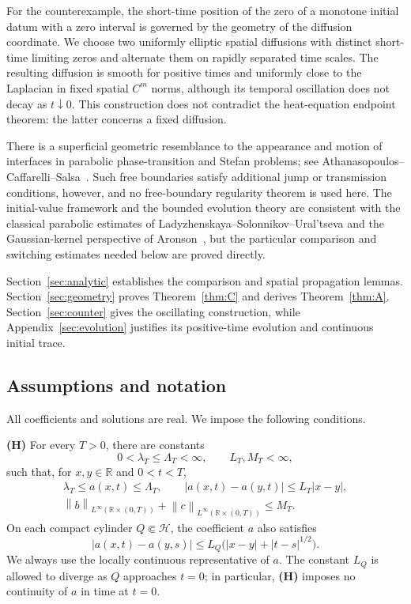 \documentclass[11pt,reqno]{amsart}
\numberwithin{equation}{section}
\theoremstyle{definition}
\theoremstyle{remark}
\newcommand{\R}{\mathbb R}
\newcommand{\HH}{\mathcal H}
\newcommand{\norm}[1]{\left\lVert#1\right\rVert}
\begin{document}
For the counterexample, the short-time position of the zero of a monotone
initial datum with a zero interval is governed by the geometry of the
diffusion coordinate.  We choose two uniformly elliptic spatial
diffusions with distinct short-time limiting zeros and alternate them
on rapidly separated time scales.  The resulting diffusion is smooth
for positive times and uniformly close to the Laplacian in fixed
spatial $C^m$ norms, although its temporal oscillation does not decay
as $t\downarrow0$.  This construction does not contradict the heat-equation endpoint theorem: the latter concerns a fixed diffusion.

There is a superficial geometric resemblance to the appearance and
motion of interfaces in parabolic phase-transition and Stefan problems;
see Athanasopoulos--Caffarelli--Salsa~\cite{ACS}.  Such free boundaries
satisfy additional jump or transmission conditions, however, and no
free-boundary regularity theorem is used here.  The initial-value
framework and the bounded evolution theory are consistent with the
classical parabolic estimates of Ladyzhenskaya--Solonnikov--Ural'tseva
\cite{LSU} and the Gaussian-kernel perspective of Aronson~\cite{Aronson},
but the particular comparison and switching estimates needed below are
proved directly.

Section~\ref{sec:analytic} establishes the comparison and spatial
propagation lemmas.  Section~\ref{sec:geometry} proves
Theorem~\ref{thm:C} and derives Theorem~\ref{thm:A}.
Section~\ref{sec:counter} gives the oscillating construction, while
Appendix~\ref{sec:evolution} justifies its positive-time evolution and
continuous initial trace.

\subsection{Assumptions and notation}
All coefficients and solutions are real. We impose the following conditions.

\smallskip
\noindent\textbf{(H)} For every $T>0$, there are constants
\[
 0<\lambda_T\leq\Lambda_T<\infty,\qquad L_T,M_T<\infty,
\]
such that, for $x,y\in\R$ and $0<t<T$,
\begin{gather}
 \lambda_T\leq a(x,t)\leq\Lambda_T,\qquad
 |a(x,t)-a(y,t)|\leq L_T|x-y|,\label{eq:Hspace}\\
 \norm{b}_{L^\infty(\R\times(0,T))}
 +\norm{c}_{L^\infty(\R\times(0,T))}\leq M_T.\label{eq:Hlower}
\end{gather}
On each compact cylinder $Q\Subset\HH$, the coefficient $a$ also satisfies
\begin{equation}\label{eq:Hlocal}
 |a(x,t)-a(y,s)|\leq L_Q\bigl(|x-y|+|t-s|^{1/2}\bigr).
\end{equation}
We always use the locally continuous representative of $a$.  The constant
$L_Q$ is allowed to diverge as $Q$ approaches $t=0$; in particular,
\textbf{(H)} imposes no continuity of $a$ in time at $t=0$.
\end{document}
